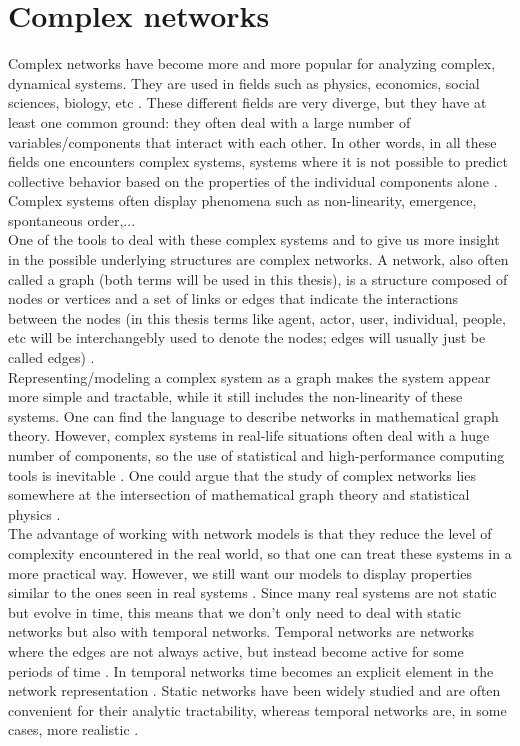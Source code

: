 \documentclass[11 pt , letterpaper , twoside , openright]{book}
\begin{document}
\section{Complex networks}\label{complNet}

Complex networks have become more and more popular for analyzing complex, dynamical systems. They are used in fields such as physics, economics, social sciences, biology, etc \cite{Costa2008}. These different fields are very diverge, but they have at least one common ground: they often deal with a large number of variables/components that interact with each other. In other words, in all these fields one encounters complex systems, systems where it is not possible to predict collective behavior based on the properties of the individual components alone \cite{Mata2020}. Complex systems often display phenomena such as non-linearity, emergence, spontaneous order,... %
\\
\newline
One of the tools to deal with these complex systems and to give us more insight in the possible underlying structures are complex networks. A network, also often called a graph (both terms will be used in this thesis), is a structure composed of nodes or vertices and a set of links or edges that indicate the interactions between the nodes (in this thesis terms like agent, actor, user, individual, people, etc will be interchangebly used to denote the nodes; edges will usually just be called edges) \cite{Mata2020}.\\
\newline
Representing/modeling a complex system as a graph makes the system appear more simple and tractable, while it still includes the non-linearity of these systems. One can find the language to describe networks in mathematical graph theory. However, complex systems in real-life situations often deal with a huge number of components, so the use of statistical and high-performance computing tools is inevitable \cite{Mata2020}. One could argue that the study of complex networks lies somewhere at the intersection of mathematical graph theory and statistical physics \cite{F.Costa2007}.\\
The advantage of working with network models is that they reduce the level of complexity encountered in the real world, so that one can treat these systems in a more practical way. However, we still want our models to display properties similar to the ones seen in real systems \cite{Mata2020}. Since many real systems are not static but evolve in time, this means that we don't only need to deal with static networks but also with temporal networks. Temporal networks are networks where the edges are not always active, but instead become active for some periods of time \cite{Holme2012}. In temporal networks time becomes an explicit element in the network representation \cite{Holme2012}. Static networks have been widely studied and are often convenient for their analytic tractability, whereas temporal networks are, in some cases, more realistic \cite{Mata2020}.\\
\end{document}
